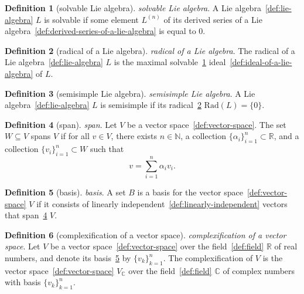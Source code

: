 \documentclass[12pt,a4paper]{article}
\theoremstyle{definition}
\newtheorem{definition}{Definition}
\begin{document}
\begin{definition}[solvable Lie algebra]\label{def:solvable-lie-algebra}
\emph{solvable Lie algebra}. A Lie algebra~\ref{def:lie-algebra} $L$ is solvable if some element $L^{(n)}$ of its derived series of a Lie algebra~\ref{def:derived-series-of-a-lie-algebra} is equal to 0.
\end{definition}

\begin{definition}[radical of a Lie algebra]\label{def:radical-of-a-lie-algebra}
\emph{radical of a Lie algebra}. The radical of a Lie algebra~\ref{def:lie-algebra} $L$ is the maximal solvable~\ref{def:solvable-lie-algebra} ideal~\ref{def:ideal-of-a-lie-algebra} of $L$.
\end{definition}

\begin{definition}[semisimple Lie algebra]\label{def:semisimple-lie-algebra}
\emph{semisimple Lie algebra}. A Lie algebra~\ref{def:lie-algebra} $L$ is semisimple if its radical~\ref{def:radical-of-a-lie-algebra} $\text{Rad}(L) = \{0\}$.
\end{definition}

\begin{definition}[span]\label{def:span}
\emph{span}. Let $V$ be a vector space~\ref{def:vector-space}. The set $W \subseteq V$ spans $V$ if for all $v \in V$, there exists $n \in \mathbb N$, a collection $\{\alpha_i\}_{i=1}^n \subset \mathbb R$, and a collection $\{v_i\}_{i=1}^n \subset W$ such that $$v = \sum_{i=1}^n \alpha_i v_i.$$
\end{definition}

\begin{definition}[basis]\label{def:basis}
\emph{basis}. A set $B$ is a basis for the vector space~\ref{def:vector-space} $V$ if it consists of linearly independent~\ref{def:linearly-independent} vectors that span~\ref{def:span} $V$.
\end{definition}

\begin{definition}[complexification of a vector space]\label{def:complexification-of-a-vector-space}
\emph{complexification of a vector space}. Let $V$ be a vector space~\ref{def:vector-space} over the field~\ref{def:field} $\mathbb R$ of real numbers, and denote its basis~\ref{def:basis} by $\{v_k\}_{k=1}^n$. The complexification of $V$ is the vector space~\ref{def:vector-space} $V_\mathbb C$ over the field~\ref{def:field} $\mathbb C$ of complex numbers with basis $\{v_k\}_{k=1}^n$.
\end{definition}
\end{document}
